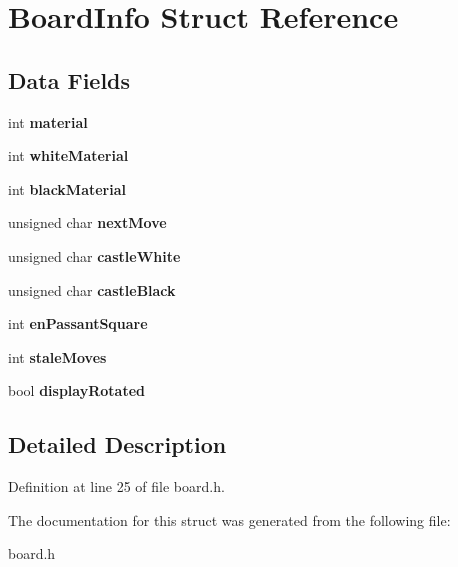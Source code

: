 \hypertarget{struct_board_info}{\section{Board\-Info Struct Reference}
\label{struct_board_info}
}
\subsection*{Data Fields}
\begin{DoxyCompactItemize}
\item 
\hypertarget{struct_board_info_a186ddea694ab836b6698d437d85c99ed}{int {\bfseries material}}\label{struct_board_info_a186ddea694ab836b6698d437d85c99ed}

\item 
\hypertarget{struct_board_info_a393b557b61f2350cfb4889e35b022cf0}{int {\bfseries white\-Material}}\label{struct_board_info_a393b557b61f2350cfb4889e35b022cf0}

\item 
\hypertarget{struct_board_info_adfa259796647069e6f18275605860f1b}{int {\bfseries black\-Material}}\label{struct_board_info_adfa259796647069e6f18275605860f1b}

\item 
\hypertarget{struct_board_info_aaa5d8181db04f85c9c9e28a3845ff1fa}{unsigned char {\bfseries next\-Move}}\label{struct_board_info_aaa5d8181db04f85c9c9e28a3845ff1fa}

\item 
\hypertarget{struct_board_info_a06e13f2d0ee08e862ea2cc84ac3545c4}{unsigned char {\bfseries castle\-White}}\label{struct_board_info_a06e13f2d0ee08e862ea2cc84ac3545c4}

\item 
\hypertarget{struct_board_info_a4813757f21c3a0b781a729f30289c210}{unsigned char {\bfseries castle\-Black}}\label{struct_board_info_a4813757f21c3a0b781a729f30289c210}

\item 
\hypertarget{struct_board_info_aa2462538b2d8962ea5a205deb7ef22e1}{int {\bfseries en\-Passant\-Square}}\label{struct_board_info_aa2462538b2d8962ea5a205deb7ef22e1}

\item 
\hypertarget{struct_board_info_ab3ae0ffbe483acefc6a7eb9fc2014d91}{int {\bfseries stale\-Moves}}\label{struct_board_info_ab3ae0ffbe483acefc6a7eb9fc2014d91}

\item 
\hypertarget{struct_board_info_abf1f34e545fe6046141a231f50e5468e}{bool {\bfseries display\-Rotated}}\label{struct_board_info_abf1f34e545fe6046141a231f50e5468e}

\end{DoxyCompactItemize}


\subsection{Detailed Description}


Definition at line 25 of file board.\-h.



The documentation for this struct was generated from the following file\-:\begin{DoxyCompactItemize}
\item 
board.\-h\end{DoxyCompactItemize}
